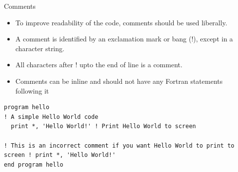 \documentclass[10pt,t]{beamer}
\begin{document}
\begin{frame}[fragile]{Comments}
  \begin{itemize}
    \item To improve readability of the code, comments should be used liberally.
    \item A comment is identified by an exclamation mark or bang (!), except in a character string.
    \item All characters after ! upto the end of line is a comment.
    \item Comments can be inline and should not have any Fortran statements following it
  \end{itemize}
  \begin{eblock}{}
    \begin{lstlisting}[language={[90]Fortran}]
program hello
! A simple Hello World code
  print *, 'Hello World!' ! Print Hello World to screen

! This is an incorrect comment if you want Hello World to print to screen ! print *, 'Hello World!'
end program hello
    \end{lstlisting}
  \end{eblock}
\end{frame}
\end{document}
